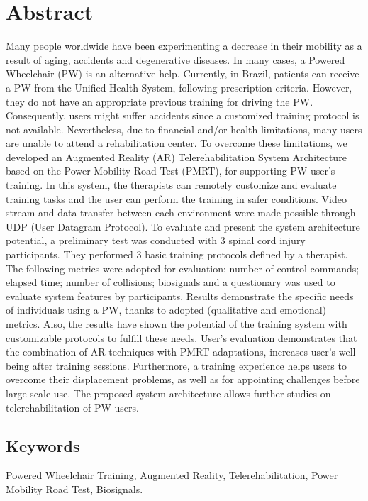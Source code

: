 \newpage
\thispagestyle{empty}
\chapter*{Abstract}
\vspace{-35pt}
Many people worldwide have been experimenting a decrease in their mobility as a result of aging, accidents and degenerative diseases. In many cases, a Powered Wheelchair (PW) is an alternative help. Currently, in Brazil, patients can receive a PW from the Unified Health System, following prescription criteria. However, they do not have an appropriate previous training for driving the PW. Consequently, users might suffer accidents since a customized training protocol is not available. Nevertheless, due to financial and/or health limitations, many users are unable to attend a rehabilitation center. To overcome these limitations, we developed an Augmented Reality (AR) Telerehabilitation System Architecture based on the Power Mobility Road Test (PMRT), for supporting PW user’s training. In this system, the therapists can remotely customize and evaluate training tasks and the user can perform the training in safer conditions. Video stream and data transfer between each environment were made possible through UDP (User Datagram Protocol). To evaluate and present the system architecture potential, a preliminary test was conducted with 3 spinal cord injury participants. They performed 3 basic training protocols defined by a therapist. The following metrics were adopted for evaluation: number of control commands; elapsed time; number of collisions; biosignals and a questionary was used to evaluate system features by participants. Results demonstrate the specific needs of individuals using a PW, thanks to adopted (qualitative and emotional) metrics.  Also, the results have shown the potential of the training system with customizable protocols to fulfill these needs. User’s evaluation demonstrates that the combination of AR techniques with PMRT adaptations, increases user’s well-being after training sessions. Furthermore, a training experience helps users to overcome their displacement problems, as well as for appointing challenges before large scale use. The proposed system architecture allows further studies on telerehabilitation of PW users.
\section*{Keywords}
Powered Wheelchair Training, Augmented Reality, Telerehabilitation, Power Mobility Road Test, Biosignals.
